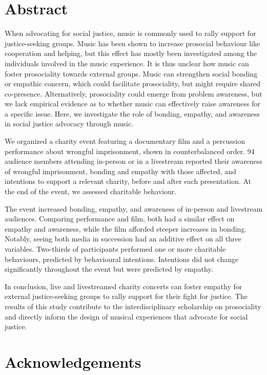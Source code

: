 \documentclass[
  man,floatsintext]{apa6}
\begin{document}
\newpage

\section*{Abstract}\label{abstract}

When advocating for social justice, music is commonly used to rally support for justice-seeking groups. Music has been shown to increase prosocial behaviour like cooperation and helping, but this effect has mostly been investigated among the individuals involved in the music experience. It is thus unclear how music can foster prosociality towards external groups. Music can strengthen social bonding or empathic concern, which could facilitate prosociality, but might require shared co-presence. Alternatively, prosociality could emerge from problem awareness, but we lack empirical evidence as to whether music can effectively raise awareness for a specific issue. Here, we investigate the role of bonding, empathy, and awareness in social justice advocacy through music.

We organized a charity event featuring a documentary film and a percussion performance about wrongful imprisonment, shown in counterbalanced order. 94 audience members attending in-person or in a livestream reported their awareness of wrongful imprisonment, bonding and empathy with those affected, and intentions to support a relevant charity, before and after each presentation. At the end of the event, we assessed charitable behaviour.

The event increased bonding, empathy, and awareness of in-person and livestream audiences. Comparing performance and film, both had a similar effect on empathy and awareness, while the film afforded steeper increases in bonding. Notably, seeing both media in succession had an additive effect on all three variables. Two-thirds of participants performed one or more charitable behaviours, predicted by behavioural intentions. Intentions did not change significantly throughout the event but were predicted by empathy.

In conclusion, live and livestreamed charity concerts can foster empathy for external justice-seeking groups to rally support for their fight for justice. The results of this study contribute to the interdisciplinary scholarship on prosociality and directly inform the design of musical experiences that advocate for social justice.

\newpage

\section*{Acknowledgements}\label{acknowledgements}
\end{document}
